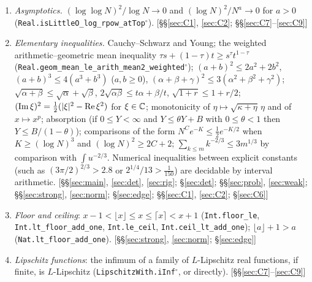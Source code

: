 \begin{enumerate}[leftmargin=2em,itemsep=1pt]
convexity of $t\mapsto t\log t$ (\texttt{Real.strictConvexOn\_mul\_log}$^\circ$); concavity of $\log$ (\texttt{strictConcaveOn\_log\_Ioi}$^\circ$); $|\sinh x|\ge|x|$, $\cosh t=1+2\sinh^2(t/2)$, monotonicity of
$\cosh$ on $[0,\infty)$; $\arctan$: derivative, strict monotonicity, range $(-\frac\pi2,\frac\pi2)$, oddness, $\arctan x+\arctan\frac1x=\frac\pi2$ for $x>0$ (\texttt{Real.arctan\_inv\_of\_pos});
$\pi>3$ (\texttt{Real.pi\_gt\_three}). \hfill[\S\S\ref{sec:main}, \ref{sec:det}, \ref{sec:rig}; \S\S\ref{sec:prob}, \ref{sec:weak}; \S\ref{sec:edge}; \S\ref{sec:C3}; \S\ref{sec:C6}; \S\S\ref{sec:C7}--\ref{sec:C9}]
\item \emph{Asymptotics.} $(\log\log N)^2/\log N\to0$ and $(\log N)^2/N^a\to0$ for $a>0$ (\texttt{Real.isLittleO\_log\_rpow\_atTop}$^\circ$). \hfill[\S\S\ref{sec:C1}, \ref{sec:C2}; \S\S\ref{sec:C7}--\ref{sec:C9}]
\item \emph{Elementary inequalities.} Cauchy--Schwarz and Young; the weighted arithmetic--geometric mean inequality $\tau s+(1-\tau)t\ge s^\tau t^{1-\tau}$
(\texttt{Real.geom\_mean\_le\_arith\_mean2\_weighted}$^\circ$); $(a+b)^2\le2a^2+2b^2$, $(a+b)^3\le4(a^3+b^3)$ ($a,b\ge0$), $(\alpha+\beta+\gamma)^2\le3(\alpha^2+\beta^2+\gamma^2)$; $\sqrt{\alpha+\beta}\le\sqrt\alpha+\sqrt\beta$,
$2\sqrt{\alpha\beta}\le t\alpha+\beta/t$, $\sqrt{1+r}\le1+r/2$; $(\operatorname{Im}\xi)^2=\frac12(|\xi|^2-\operatorname{Re}\xi^2)$ for $\xi\in\mathbb{C}$; monotonicity of $\eta\mapsto\sqrt{\kappa+\eta}\,\eta$ and of $x\mapsto x^p$;
absorption (if $0\le Y<\infty$ and $Y\le\theta Y+B$ with $0\le\theta<1$ then $Y\le B/(1-\theta)$); comparisons of the form $N^Ce^{-K}\le\frac12e^{-K/2}$ when $K\ge(\log N)^3$ and $(\log N)^2\ge2C+2$;
$\sum_{k\le m}k^{-2/3}\le3m^{1/3}$ by comparison with $\int u^{-2/3}$. Numerical inequalities between explicit constants (such as $(3\pi/2)^{2/3}>2.8$ or $2^{1/4}/13>\frac1{150}$) are decidable by
interval arithmetic. \hfill[\S\S\ref{sec:main}, \ref{sec:det}, \ref{sec:rig}; \S\ref{sec:det}; \S\S\ref{sec:prob}, \ref{sec:weak}; \S\S\ref{sec:strong}, \ref{sec:norm}; \S\ref{sec:edge}; \S\S\ref{sec:C1}, \ref{sec:C2}; \S\ref{sec:C6}]
\item \emph{Floor and ceiling}: $x-1<\lfloor x\rfloor\le x\le\lceil x\rceil<x+1$ (\texttt{Int.floor\_le}, \texttt{Int.lt\_floor\_add\_one}, \texttt{Int.le\_ceil}, \texttt{Int.ceil\_lt\_add\_one}); $\lfloor a\rfloor+1>a$
(\texttt{Nat.lt\_floor\_add\_one}). \hfill[\S\S\ref{sec:strong}, \ref{sec:norm}; \S\ref{sec:edge}]
\item \emph{Lipschitz functions}: the infimum of a family of $L$-Lipschitz real functions, if finite, is $L$-Lipschitz (\texttt{LipschitzWith.iInf}$^\circ$, or directly). \hfill[\S\S\ref{sec:C7}--\ref{sec:C9}]
\end{enumerate}

